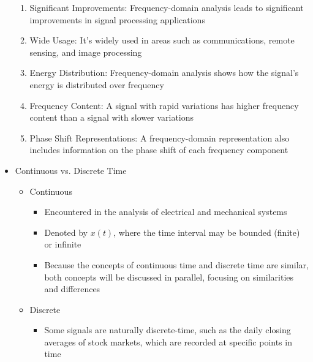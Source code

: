 \begin{itemize}
\begin{enumerate}
      \item Significant Improvements: Frequency-domain analysis leads to significant improvements in signal processing applications

      \item Wide Usage: It's widely used in areas such as communications, remote sensing, and image processing

      \item Energy Distribution: Frequency-domain analysis shows how the signal's energy is distributed over frequency

      \item Frequency Content: A signal with rapid variations has higher frequency content than a signal with slower variations

      \item Phase Shift Representations: A frequency-domain representation also includes information on the phase shift of each frequency component

    \end{enumerate}

  \item Continuous vs. Discrete Time

    \begin{itemize}

      \item Continuous

        \begin{itemize}

          \item Encountered in the analysis of electrical and mechanical systems

          \item Denoted by $x(t)$, where the time interval may be bounded (finite) or infinite

          \item Because the concepts of continuous time and discrete time are similar, both concepts will be discussed in parallel, focusing on similarities and differences

        \end{itemize}

      \item Discrete

        \begin{itemize}

          \item Some signals are naturally discrete-time, such as the daily closing averages of stock markets, which are recorded at specific points in time


\end{itemize}
\end{itemize}
\end{itemize}
